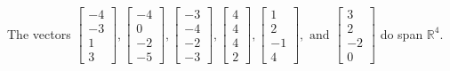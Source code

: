 \begin{exercise}
\begin{exerciseStatement}
  \end{exerciseStatement}
  \begin{exerciseAnswer}
   The vectors \(\left[\begin{array}{r}
-4 \\
-3 \\
1 \\
3
\end{array}\right] , \left[\begin{array}{r}
-4 \\
0 \\
-2 \\
-5
\end{array}\right] , \left[\begin{array}{r}
-3 \\
-4 \\
-2 \\
-3
\end{array}\right] , \left[\begin{array}{r}
4 \\
4 \\
4 \\
2
\end{array}\right] , \left[\begin{array}{r}
1 \\
2 \\
-1 \\
4
\end{array}\right] , \text{ and } \left[\begin{array}{r}
3 \\
2 \\
-2 \\
0
\end{array}\right]\) 
  	 do  
	span \(\mathbb{R}^4\).
  


  \end{exerciseAnswer}
\end{exercise}
